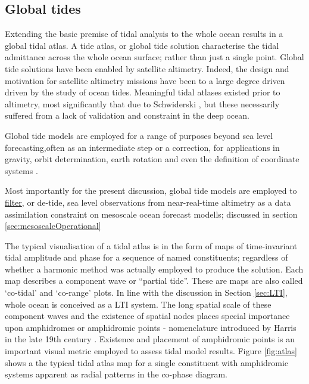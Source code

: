 \subsection{Global tides}
\label{sec:spatialTides}
Extending the basic premise of tidal analysis to the whole ocean results in a global tidal atlas.  A tide atlas, or global tide solution characterise the tidal admittance across the whole ocean surface; rather than just a single point.
Global tide solutions have been enabled by satellite altimetry.
Indeed, the design and motivation for satellite altimetry missions have been to a large degree driven driven by the study of ocean tides.
Meaningful tidal atlases existed prior to altimetry, most significantly that due to Schwiderski \citep{Schwiderski:1983ke}, but these necessarily suffered from a lack of validation and constraint in the deep ocean.


Global tide models are employed for a range of purposes beyond sea level forecasting,often as an intermediate step or a correction, for applications in gravity, orbit determination, earth rotation and even the definition of coordinate systems \citep{IERS2003}.

Most importantly for the present discussion, global tide models are employed to \underline{filter}, or de-tide, sea level observations from near-real-time altimetry as a data assimilation constraint on mesoscale ocean forecast modells; discussed in section \ref{sec:mesoscaleOperational}


The typical visualisation of a tidal atlas is in the form of maps of time-invariant tidal amplitude and phase for a sequence of named constituents; regardless of whether a harmonic method was actually employed to produce the solution.   Each map describes a component wave or ``partial tide''.  These are maps are also called `co-tidal' and `co-range' plots.
In line with the discussion in Section \ref{sec:LTI}, whole ocean is conceived as a LTI system. 
The long spatial scale of these component waves and the existence of spatial nodes places special importance upon amphidromes or amphidromic points - nomenclature introduced by Harris in the late 19th century \cite[pp 119]{Cartwright:2000tt}.  Existence and placement of amphidromic points is an important visual metric employed to assess tidal model results.  
Figure \ref{fig:atlas} shows a the typical tidal atlas map for a single constituent with amphidromic systems apparent as radial patterns in the co-phase diagram.

